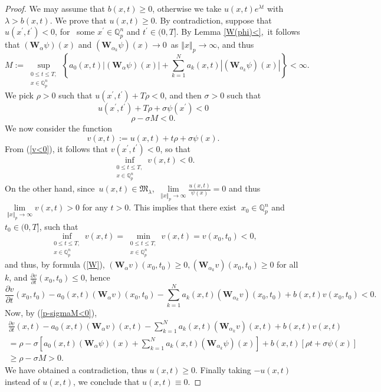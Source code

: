 \documentclass{amsart}\usepackage{amsfonts}
\theoremstyle{plain}
\numberwithin{equation}{section}
\begin{document}
\begin{proof}
We may assume that $b(x,t)\geq0$, otherwise we take $u(x,t)e^{\lambda t}$ with
$\lambda>b(x,t)$. We prove that $u(x,t)\geq0$. By contradiction, suppose that
$u(x^{\prime},t^{\prime})<0$, for \ some $x^{\prime}\in\mathbb{Q}_{p}^{n}$ and
$t^{\prime}\in(0,T]$. By Lemma \ref{W(phi)<},\ it follows that $(\mathbf{W}_{\alpha}\psi)(x)$ and $(\mathbf{W}_{\alpha_{k}}\psi)(x)\rightarrow0$\ as
$\left\Vert x\right\Vert _{p}\rightarrow\infty$, and thus\[
M:=\sup_{\substack{0\leq t\leq T,\\x\in\mathbb{Q}_{p}^{n}}}\left\{
a_{0}(x,t)\left\vert (\boldsymbol{\mathbf{W}}_{\alpha}\psi)(x)\right\vert
+\sum_{k=1}^{N}a_{k}(x,t)\left\vert (\boldsymbol{\mathbf{W}}_{\alpha_{k}}\psi)(x)\right\vert \right\}  <\infty.
\]
We pick $\rho>0$ such that $u(x^{\prime},t^{\prime})+T\rho<0$, and then
$\sigma>0$ such that
\begin{equation}
u(x^{\prime},t^{\prime})+T\rho+\sigma\psi(x^{\prime})<0 \label{v<0}\end{equation}\begin{equation}
\rho-\sigma M<0. \label{p-sigmaM<0}\end{equation}
We now consider the function\[
v(x,t):=u(x,t)+t\rho+\sigma\psi(x).
\]
From (\ref{v<0}), it follows that $v(x^{\prime},t^{\prime})<0$, so that\[
\inf_{\substack{0\leq t\leq T,\\x\in\mathbb{Q}_{p}^{n}}}v\left(  x,t\right)
<0.
\]
On the other hand, since\ $u(x,t)\in\mathcal{\mathfrak{M}}_{\lambda}$,\ $\underset{\left\Vert x\right\Vert _{p}\rightarrow\infty}{\lim}\frac{u(x,t)}{\psi(x)}=0$ and thus $\underset{\left\Vert x\right\Vert
_{p}\rightarrow\infty}{\lim}v(x,t)>0$ for any $t>0$. This implies that there
exist $\ x_{0}\in\mathbb{Q}_{p}^{n}$ and $t_{0}\in(0,T]$, such that\[
\inf_{\substack{0\leq t\leq T,\\x\in\mathbb{Q}_{p}^{n}}}v\left(  x,t\right)
=\min_{\substack{0\leq t\leq T,\\x\in\mathbb{Q}_{p}^{n}}}v(x,t)=v(x_{0},t_{0})<0,
\]
and thus, by formula (\ref{W}), $(\mathbf{W}_{\alpha}v)(x_{0},t_{0})\geq0,(\mathbf{W}_{\alpha_{k}}v)(x_{0},t_{0})\geq0$ for all $k$, and
$\frac{\partial v}{\partial t}(x_{0},t_{0})\leq0$, hence\[
\frac{\partial v}{\partial t}(x_{0},t_{0})-a_{0}(x,t)(\boldsymbol{\mathbf{W}}_{\alpha}v)(x_{0},t_{0})-\sum_{k=1}^{N}a_{k}(x,t)(\boldsymbol{\mathbf{W}}_{\alpha_{k}}v)(x_{0},t_{0})+b(x,t)v(x_{0},t_{0})<0.
\]
Now, by (\ref{p-sigmaM<0}),\begin{multline*}
\frac{\partial v}{\partial t}(x,t)-a_{0}(x,t)(\boldsymbol{\mathbf{W}}_{\alpha
}v)(x,t)-\sum_{k=1}^{N}a_{k}(x,t)(\boldsymbol{\mathbf{W}}_{\alpha_{k}}v)(x,t)+b(x,t)v(x,t)\\
=\rho-\sigma\left[  a_{0}(x,t)(\boldsymbol{\mathbf{W}}_{\alpha}\psi
)(x)+\sum_{k=1}^{N}a_{k}(x,t)(\boldsymbol{\mathbf{W}}_{\alpha_{k}}\psi)(x)\right]  +b(x,t)\left[  \rho t+\sigma\psi(x)\right] \\
\geq\rho-\sigma M>0.
\end{multline*}
We have obtained a contradiction, thus $u(x,t)\geq0$. Finally taking $-u(x,t)$
instead of $u(x,t)$, we conclude that $u(x,t)\equiv0$.
\end{proof}
\end{document}
